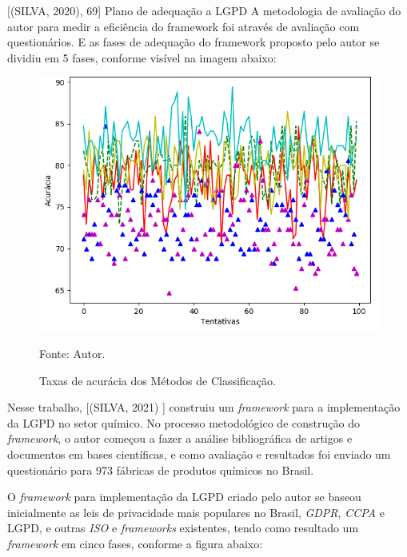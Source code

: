 \documentclass[
	12pt,				%
	openright,			%
	oneside,			%
	a4paper,			%
	english,			%
	french,				%
	spanish,			%
	brazil,				%
	]{abntex2}
\begin{document}
[(SILVA, 2020), 69] Plano de adequação a LGPD
A metodologia de avaliação do autor para medir a eficiência do framework foi através de avaliação com questionários. E as fases de adequação do framework proposto pelo autor se dividiu em 5 fases, conforme visível na imagem abaixo: 

\begin{figure}[ht]
    \centering
    \caption{Taxas de acurácia dos Métodos de Classificação.}
    \includegraphics[width=5.0in]{Images/acc-classification.png}
    \label{fig: grafico-acc}
    
    \centering \small Fonte: Autor.
\end{figure}

Nesse trabalho, [(SILVA, 2021) ] construiu um \textit{framework} para a implementação da LGPD no setor químico. No processo metodológico de construção do \textit{framework}, o autor começou a fazer a análise bibliográfica de artigos e documentos em bases científicas, e como avaliação e resultados foi enviado um questionário para 973 fábricas de produtos químicos no Brasil.

O \textit{framework} para implementação da LGPD criado pelo autor se baseou inicialmente as leis de privacidade mais populares no Brasil, \textit{GDPR}, \textit{CCPA} e LGPD, e outras \textit{ISO} e \textit{frameworks} existentes, tendo como resultado um \textit{framework} em cinco fases, conforme a figura abaixo:
\end{document}
